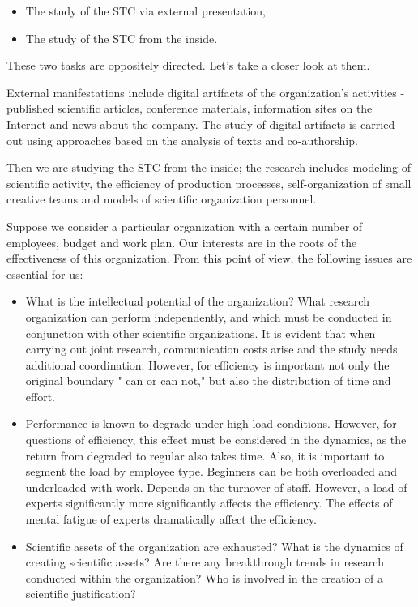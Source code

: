 \documentclass[12pt]{report}
\theoremstyle{definition}
\begin{document}
\begin{itemize}
	\item The study of the STC via external presentation,
	\item The study of the STC from the inside.
\end{itemize}	

These two tasks are oppositely directed. Let's take a closer look at them.

External manifestations include digital artifacts of the organization's activities - published scientific articles, conference materials, information sites on the Internet and news about the company.  
The study of digital artifacts is carried out using approaches based on the analysis of texts and co-authorship.

Then we are studying the STC from the inside; the research includes modeling of scientific activity, the efficiency of production processes, self-organization of small creative teams and models of scientific organization personnel.

Suppose we consider a particular organization with a certain
number of employees, budget and work plan. 
Our interests are in the roots of the effectiveness of this organization. 
From this point of view, the following issues are essential for us:

\begin{itemize}
	\item 
	What is the intellectual potential of the organization? 
	What research organization can perform independently, and which must be conducted in conjunction with other scientific organizations. 
	It is evident that when carrying out joint research, communication costs arise and the study needs additional coordination. 
	However, for efficiency is important not only the original boundary " can or can not," but also the distribution of time and effort.
	\item 
	Performance is known to degrade under high load conditions.
	However, for questions of efficiency, this effect must be considered in the dynamics, as the return from degraded to regular also takes time.
	Also, it is important to segment the load by employee type. 
	Beginners can be both overloaded and underloaded with work. 
	Depends on the turnover of staff. 
	However, a load of experts significantly more significantly affects the efficiency. 
	The effects of mental fatigue of experts dramatically affect the efficiency.
	\item 
	Scientific assets of the organization are exhausted? 
	What is the dynamics of creating scientific assets? 
	Are there any breakthrough trends in research conducted within the organization? 
	Who is involved in the creation of a scientific justification?
\end{itemize}
\end{document}
